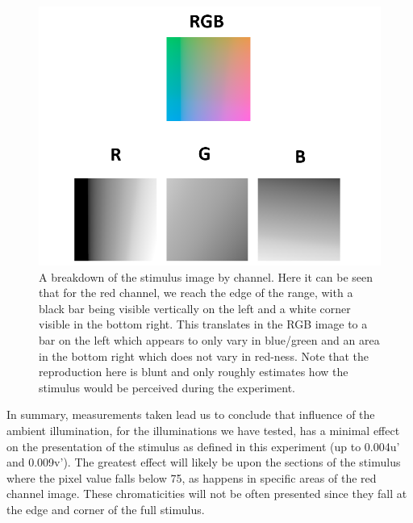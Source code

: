 \begin{figure}[hbtp]
\includegraphics[max width=\textwidth]{figs/tablet/stimchan.png}
\caption{A breakdown of the stimulus image by channel. Here it can be seen that for the red channel, we reach the edge of the range, with a black bar being visible vertically on the left and a white corner visible in the bottom right. This translates in the RGB image to a bar on the left which appears to only vary in blue/green and an area in the bottom right which does not vary in red-ness. Note that the reproduction here is blunt and only roughly estimates how the stimulus would be perceived during the experiment.}
\label{fig:stimchan}
\end{figure}

In summary, measurements taken lead us to conclude that influence of the ambient illumination, for the illuminations we have tested, has a minimal effect on the presentation of the stimulus as defined in this experiment (up to 0.004u' and 0.009v'). The greatest effect will likely be upon the sections of the stimulus where the pixel value falls below 75, as happens in specific areas of the red channel image. These chromaticities will not be often presented since they fall at the edge and corner of the full stimulus. %


